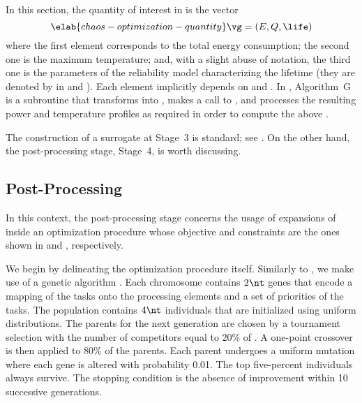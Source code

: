 In this section, the quantity of interest \g in  is the
vector
\begin{equation} \elab{chaos-optimization-quantity}
  \vg = (E, Q, \life)
\end{equation}
where the first element corresponds to the total energy consumption; the second
one is the maximum temperature; and, with a slight abuse of notation, the third
one is the parameters of the reliability model characterizing the lifetime (they
are denoted by \vg in  and
). Each element implicitly depends on \schedule
and \vu. In , Algorithm~G is a subroutine that
transforms \vz into \vu, makes a call to
, and processes the resulting
power and temperature profiles as required in order to compute the above \vg.

The construction of a surrogate at Stage~3 is standard; see
. On the other hand, the post-processing stage,
Stage~4, is worth discussing.

\subsection{Post-Processing}

In this context, the post-processing stage concerns the usage of expansions of
 inside an optimization procedure whose
objective and constraints are the ones shown in
 and ,
respectively.

We begin by delineating the optimization procedure itself. Similarly to
, we make use of a genetic algorithm
\cite{schmitz2004}. Each chromosome contains $2 \nt$ genes that encode a mapping
of the tasks onto the processing elements and a set of priorities of the tasks.
The population contains $4 \nt$ individuals that are initialized using uniform
distributions. The parents for the next generation are chosen by a tournament
selection with the number of competitors equal to 20\% of \nt. A one-point
crossover is then applied to 80\% of the parents. Each parent undergoes a
uniform mutation where each gene is altered with probability 0.01. The top
five-percent individuals always survive. The stopping condition is the absence
of improvement within 10 successive generations.

